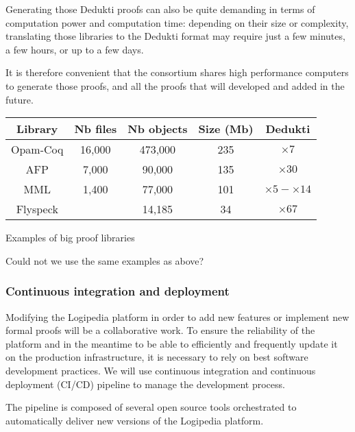 Generating those Dedukti proofs can also be quite demanding in terms
of computation power and computation time: depending on their size or
complexity, translating those libraries to the Dedukti format may
require just a few minutes, a few hours, or up to a few days.

It is therefore convenient that the consortium shares high performance
computers to generate those proofs, and all the proofs that will
developed and added in the future.

\begin{center}
\begin{tabular}{|c|c|c|c|c|}\hline
Library & Nb files & Nb objects & Size (Mb) & Dedukti\\\hline
Opam-Coq & 16,000 & 473,000 & 235 & $\times 7$\\\hline
AFP & 7,000 & 90,000 & 135 & $\times 30$\\\hline
MML & 1,400 & 77,000 & 101 & $\times 5-\times 14$\\\hline
Flyspeck & & 14,185 & 34 & $\times 67$\\\hline
\end{tabular}

\medskip

Examples of big proof libraries
\end{center}

{\color{red} Could not we use the same examples as above?}

\subsubsection*{Continuous integration and deployment}
Modifying the Logipedia platform in order to add new features or implement
new formal proofs will be a collaborative work. To ensure the reliability
of the platform and in the meantime to be able to efficiently and
frequently update it on the production infrastructure,
it is necessary to rely on best software development practices.
We will use continuous integration and continuous deployment (CI/CD)
pipeline to manage the development process.

The pipeline is composed of several open source tools orchestrated
to automatically deliver new versions of the Logipedia platform.

